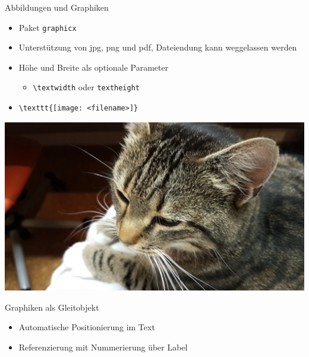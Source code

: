 \documentclass[presentation,aspectratio=169]{beamer}
\begin{document}
\begin{frame}[fragile]{Abbildungen und Graphiken}
  \begin{itemize}
    \item Paket \verb|graphicx|
    \item Unterstützung von jpg, png und pdf, Dateiendung kann weggelassen werden
    \item Höhe und Breite als optionale Parameter
      \begin{itemize}
        \item \verb|\textwidth| oder \verb|textheight|
      \end{itemize}
    \item
      \begin{verbatim}
\texttt{[image: <filename>]}
      \end{verbatim}
  \end{itemize}
  \begin{center}
    \includegraphics[height=.5\textheight]{katze}
  \end{center}
\end{frame}

\begin{frame}{Graphiken als Gleitobjekt}
  \begin{itemize}
    \item Automatische Positionierung im Text
    \item Referenzierung mit Nummerierung über Label
  \end{itemize}
  \begin{minipage}[c]{.4\textwidth}
    
  \end{minipage}
  \hfill
  \begin{minipage}[c]{.5\textwidth}
    \inputminted{latex}{codebeispiele/graphics-figure.tex}
  \end{minipage}
\end{frame}
\end{document}
